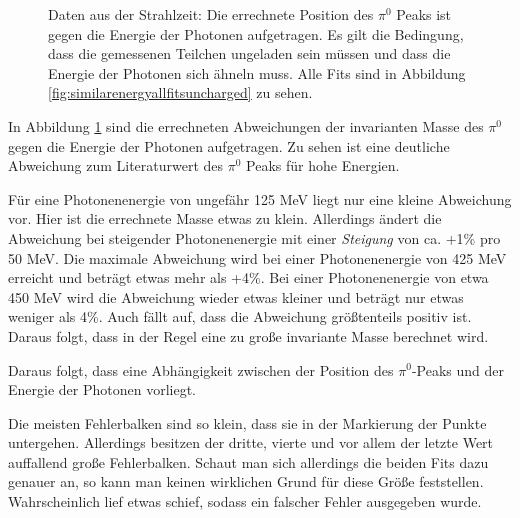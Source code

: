 \documentclass[a4paper,11pt,oneside,final,german,openbib,pdftex]{scrbook}
\begin{document}
{\begin{figure}[h!]
\begin{center}
 		\caption[Strahlzeit: Abweichung; keine weiteren Bedingungen]{Daten aus der Strahlzeit: Die errechnete Position des $\pi^0$ Peaks ist gegen die Energie der Photonen aufgetragen.
 			Es gilt die Bedingung, dass die gemessenen Teilchen ungeladen sein m\"ussen und dass die Energie der Photonen sich \"ahneln muss. Alle Fits sind in Abbildung \ref{fig:similarenergyallfitsuncharged} zu sehen.} 
 		\label{fig.Energydependency_pion}
 	\end{center}
 \end{figure}

In Abbildung \ref{fig.Energydependency_pion} sind die errechneten Abweichungen der invarianten Masse des $\pi^0$ gegen die Energie der Photonen aufgetragen. Zu sehen ist eine deutliche Abweichung zum Literaturwert des $\pi^0$ Peaks für hohe Energien. 

F\"ur eine Photonenenergie von ungef\"ahr 125 MeV liegt nur eine kleine Abweichung vor. Hier ist die errechnete Masse etwas zu klein. Allerdings \"andert die Abweichung bei steigender Photonenenergie mit einer \textit{Steigung} von ca. +1\% pro 50 MeV. Die maximale Abweichung wird bei einer Photonenenergie von 425 MeV erreicht und betr\"agt etwas mehr als +4\%. Bei einer Photonenenergie von etwa 450 MeV wird die Abweichung wieder etwas kleiner und betr\"agt nur etwas weniger als 4\%.
Auch fällt auf, dass die Abweichung größtenteils positiv ist. Daraus folgt, dass in der Regel eine zu gro{\ss}e invariante Masse berechnet wird.

Daraus folgt, dass eine Abhängigkeit zwischen der Position des $\pi^0$-Peaks und der Energie der Photonen vorliegt. 



Die meisten Fehlerbalken sind so klein, dass sie in der Markierung der Punkte untergehen. Allerdings besitzen der dritte, vierte und vor allem der letzte Wert auffallend große Fehlerbalken. Schaut man sich allerdings die beiden Fits dazu genauer an, so kann man keinen wirklichen Grund für diese Größe feststellen. Wahrscheinlich lief etwas schief, sodass ein falscher Fehler ausgegeben wurde.


}
\end{document}
